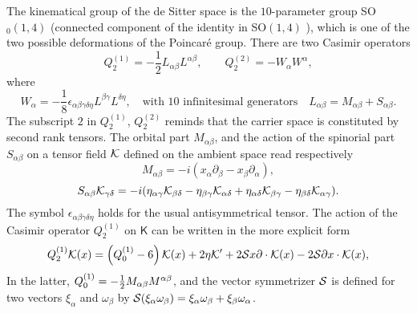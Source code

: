\documentclass[a4paper,11pt,showpacs,preprintnumbers]{revtex4}
\def\K{\textsf{K}}
\begin{document}
The kinematical group of the de Sitter space is the $10$-parameter
group SO$_0(1,4)$ (connected component of the identity in
SO$(1,4)$ ), which is one of the two possible deformations of the
Poincar\'e group. There are two Casimir operators
\begin{equation}
Q^{(1)}_2=-\frac{1}{2}L_{\alpha\beta}L^{\alpha\beta},\qquad
Q^{(2)}_2=-W_{\alpha}W^{\alpha},\label{eq:cas}
\end{equation}
where
\begin{equation}
W_{\alpha}=-\frac{1}{8}\epsilon_
{\alpha\beta\gamma\delta\eta}L^{\beta\gamma}L^{\delta\eta},
\quad\mbox{with  10 infinitesimal generators}\quad
L_{\alpha\beta}=M_{\alpha\beta}+S_{\alpha\beta}.
\end{equation}
The subscript $2$ in $Q^{(1)}_2$, $Q^{(2)}_2$ reminds that the
carrier space is constituted by  second rank tensors. The orbital
part $M_{\alpha\beta}$, and the action of the spinorial part
$S_{\alpha\beta}$ on a tensor field ${\cal K}$ defined on the
ambient space read respectively \cite{gaha}
$$M_{\alpha\beta}=-i (x_\alpha\partial_\beta-x_\beta\partial_\alpha),$$
\begin{equation}
S_{\alpha\beta}{\cal K}_{\gamma\delta}=-i(\eta_{\alpha\gamma}{\cal
K}_{\beta\delta}-\eta_{\beta\gamma} {\cal
K}_{\alpha\delta}+\eta_{\alpha\delta}{\cal
K}_{\beta\gamma}-\eta_{\beta\delta}{\cal K}_{\alpha\gamma}).
\label{eq:spi}
\end{equation}
The symbol $\epsilon_{\alpha\beta\gamma\delta\eta}$ holds for the
usual antisymmetrical tensor. The action of the Casimir operator
$Q_2^{(1)}$  on $\K$ can be written in the more explicit form
\begin{equation}\label{eq:act}
Q_2^{(1)}{\cal K}(x)=\left(Q_{0}^{(1)}-6\right){\cal K}(x)+2\eta
{\cal K}'+2{\cal S} x\partial\cdot{\cal K}(x)-2{\cal S}  \partial
x\cdot{\cal K}(x),
\end{equation}
In the latter,
$Q_{0}^{(1)}=-{{1}\over{2}}M_{\alpha\beta}M^{\alpha\beta}$, and
the vector symmetrizer ${\cal S}$ is defined for two vectors
$\xi_{\alpha}$ and $\omega_{\beta}$ by ${\cal
S}(\xi_{\alpha}\omega_{\beta})=\xi_{\alpha}\omega_{\beta}+\xi_{\beta}\omega_{\alpha}$.
\end{document}
